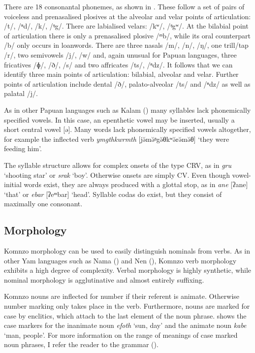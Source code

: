 There are 18 consonantal phonemes, as shown in . These follow a set of pairs of voiceless and prenasalised plosives at the alveolar and velar points of articulation: /t/, /ⁿd/, /k/, /ᵑg/. There are labialised velars: /kʷ/, /ᵑgʷ/. At the bilabial point of articulation there is only a prenasalised plosive /ᵐb/, while its oral counterpart /b/ only occurs in loanwords. There are three {nasals} /m/, /n/, /ŋ/, one trill/tap /r/, two semivowels /j/, /w/ and, again unusual for Papuan languages, three {fricatives} /ɸ/, /ð/, /s/ and two affricates /ts/, /ⁿdz/. It follows that we can identify three main points of articulation: bilabial, alveolar and velar. Further points of articulation include dental /ð/, palato-alveolar /ts/ and /ⁿdz/ as well as palatal /j/.

As in other Papuan languages such as {Kalam} (\cite{Blevins:2010ur}) many syllables lack phonemically specified vowels. In this case, an epenthetic vowel may be inserted, usually a short central vowel [ə]. Many words lack phonemically specified vowels altogether, for example the inflected verb \emph{ymgthkwrmth} [jə̆mə̆ᵑgə̆θkʷə̆rə̆mə̆θ] `they were feeding him'.

The {syllable} structure allows for complex onsets of the type CRV, as in \emph{gru} `shooting star' or \emph{srak} `boy'. Otherwise onsets are simply CV. Even though vowel-initial words exist, they are always produced with a {glottal stop}, as in \emph{ane} [ʔane] `that' or \emph{ebar} [ʔeᵐbar] `head'. Syllable codas do exist, but they consist of maximally one consonant.
\vspace{-.1cm}
\subsection{Morphology}
\vspace{-.1cm}
Komnzo morphology can be used to easily distinguish nominals from verbs. As in other Yam languages such as Nama (\citealt{Siegel:2017ku, Siegel:2023ay}) and Nen (\cite{Evans:2015aa}), Komnzo verb morphology exhibits a high degree of complexity. Verbal morphology is highly synthetic, while nominal morphology is agglutinative and almost entirely suffixing.

Komnzo nouns are inflected for number if their referent is animate. Otherwise number marking only takes place in the verb. Furthermore, nouns are marked for case by enclitics, which attach to the last element of the noun phrase.  shows the case markers for the inanimate noun \emph{efoth} `sun, day' and the animate noun \emph{kabe} `man, people'. For more information on the range of meanings of case marked noun phrases, I refer the reader to the grammar (\cite[135ff.]{Dohler:2018qt}).

